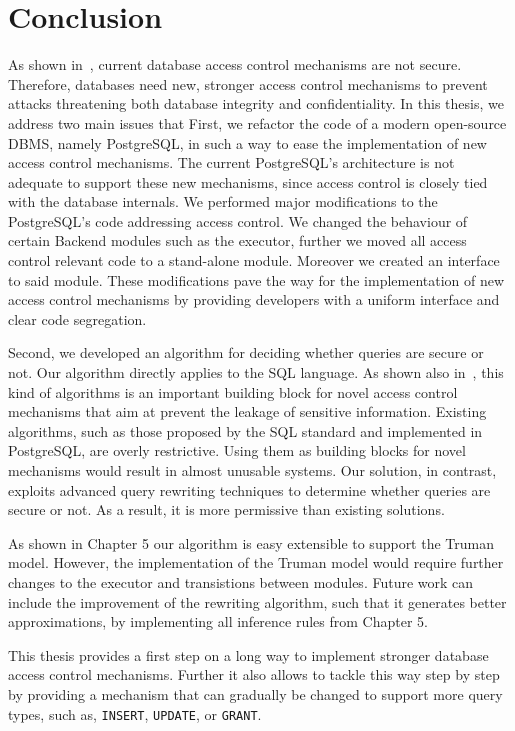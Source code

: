 \section{Conclusion}

As shown in~\cite{guarnieri2016strong}, current database access control mechanisms are not secure.
%
Therefore, databases need new, stronger access control mechanisms to prevent attacks threatening both database integrity and confidentiality.
%
In this thesis, we address two main issues that 
%
First, we refactor the code of a modern open-source DBMS, namely PostgreSQL, in such a way to ease the implementation of new access control mechanisms.
%
The current PostgreSQL's architecture is not adequate to support these new mechanisms, since access control is closely tied with the database internals.
%
We performed  major modifications to the PostgreSQL's code addressing access control.
%
We changed the behaviour of certain Backend modules such as the executor, further we moved all access control relevant code to a stand-alone module. 
%
Moreover we created an interface to said module.
%
These modifications pave the way for the implementation of new access control mechanisms by providing developers with a uniform interface and clear code segregation.


Second, we developed an algorithm for deciding whether queries are secure or not.
%
Our algorithm directly applies to the SQL language.
%
As shown also in~\cite{guarnieri2016strong}, this kind of algorithms is an important building block for novel access control mechanisms that aim at prevent the leakage of sensitive information.
%
Existing algorithms, such as those proposed by the SQL standard and implemented in PostgreSQL, are overly restrictive.
%
Using them as building blocks for novel mechanisms would result in almost unusable systems.
%
Our solution, in contrast, exploits advanced query rewriting techniques to determine whether queries are secure or not. 
%
As a result, it is more permissive than existing solutions.

As shown in Chapter 5 our algorithm is easy extensible to support the Truman model.
%
However, the implementation of the Truman model would require further changes to the executor and transistions between modules.
%
Future work can include the improvement of the rewriting algorithm, such that it generates better approximations, by implementing all inference rules from Chapter 5.

This thesis provides a first step on a long way to implement stronger database access control mechanisms.
%
Further it also allows to tackle this way step by step by providing a mechanism that can gradually be changed to support more query types, such as, \texttt{INSERT}, \texttt{UPDATE}, or \texttt{GRANT}.
